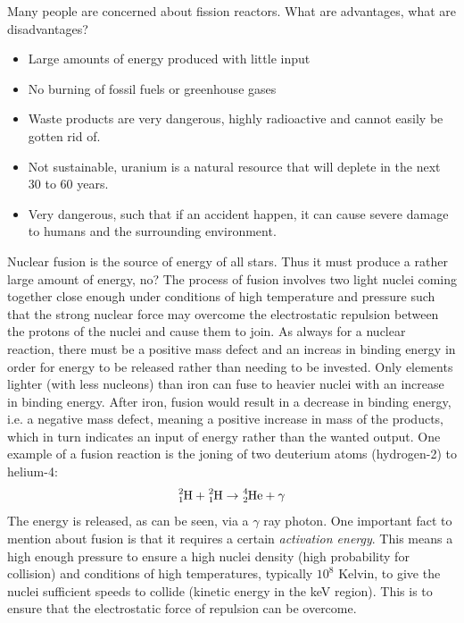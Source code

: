 Many people are concerned about fission reactors. What are advantages, what are disadvantages?

\begin{itemize}


	\begin{itemize}

		\item Large amounts of energy produced with little input
		\item No burning of fossil fuels or greenhouse gases

	\end{itemize}


	\begin{itemize}

		\item Waste products are very dangerous, highly radioactive and cannot easily be gotten rid of.

		\item Not sustainable, uranium is a natural resource that will deplete in the next 30 to 60 years.

		\item Very dangerous, such that if an accident happen, it can cause severe damage to humans and the surrounding environment.

	\end{itemize}

\end{itemize}


Nuclear fusion is the source of energy of all stars. Thus it must produce a rather large amount of energy, no? The process of fusion involves two light nuclei coming together close enough under conditions of high temperature and pressure such that the strong nuclear force may overcome the electrostatic repulsion between the protons of the nuclei and cause them to join. As always for a nuclear reaction, there must be a positive mass defect and an increas in binding energy in order for energy to be released rather than needing to be invested. Only elements lighter (with less nucleons) than iron can fuse to heavier nuclei with an increase in binding energy. After iron, fusion would result in a decrease in binding energy, i.e. a negative mass defect, meaning a positive increase in mass of the products, which in turn indicates an input of energy rather than the wanted output. One example of a fusion reaction is the joning of two deuterium atoms (hydrogen-2) to helium-4: $$\ce{^2_1H} + \ce{^2_1H} \rightarrow \ce{^4_2He} + \gamma$$ The energy is released, as can be seen, via a $\gamma$ ray photon. One important fact to mention about fusion is that it requires a certain \emph{activation energy}. This means a high enough pressure to ensure a high nuclei density (high probability for collision) and conditions of high temperatures, typically $10^8$ Kelvin, to give the nuclei sufficient speeds to collide (kinetic energy in the keV region). This is to ensure that the electrostatic force of repulsion can be overcome. 

